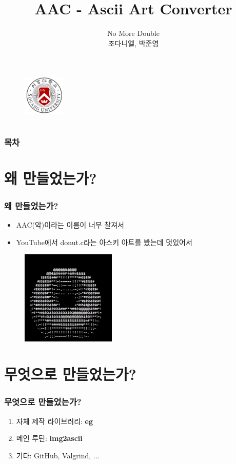 \documentclass{beamer}
\title{AAC - Ascii Art Converter}
\author{No More Double \\ 조다니엘, 박준영}
\date{\displaydate{date}}
\institute{Sogang University \\ CSE2035/AIE2051}
\newcommand{\eg}{\textbf{eg}}
\newcommand{\imgascii}{\textbf{img2ascii}}
\begin{document}
\section{}
\begin{frame}{}
	\titlepage
	\begin{figure}
		\vspace{-1em}
		\includegraphics[width=2cm]{SogangUniversityLogo}
		\vspace{1em}
	\end{figure}
\end{frame}

\section{}
\begin{frame}{}
	\frametitle{목차}
	\tableofcontents
\end{frame}

\section{왜 만들었는가?}
\begin{frame}{}
	\frametitle{왜 만들었는가?}
	\begin{itemize}
		\item AAC(악)이라는 이름이 너무 찰져서
		\item YouTube에서 donut.c라는 아스키 아트를 봤는데 멋있어서\cite{donut}
	\end{itemize}
	\begin{figure}
		\centering
		\includegraphics[width=4.5cm, height=4.5cm]{Donut.png}
	\end{figure}
\end{frame}

\section{무엇으로 만들었는가?}
\begin{frame}{}
	\frametitle{무엇으로 만들었는가?}
	\begin{enumerate}
		\item 자체 제작 라이브러리: \eg
		\item 메인 루틴: \imgascii
		\item 기타: GitHub, Valgrind, ...
	\end{enumerate}
\end{frame}
\end{document}
